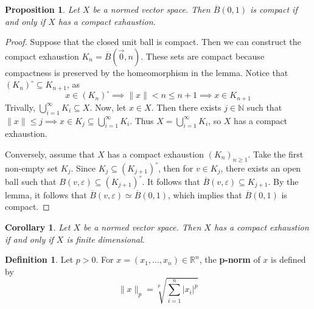 \documentclass{article}
\newcommand{\cl}[1]{\overline{#1}}
\theoremstyle{plain} %
\numberwithin{thm}{section} %
\newtheorem{prop}[thm]{Proposition}
\newtheorem{cor}[thm]{Corollary}
\theoremstyle{definition}
\newtheorem{defn}[thm]{Definition}
\begin{document}
    \begin{prop}
        Let \(X\) be a normed vector space. Then \(\cl{B}(0, 1)\) is compact if and only if \(X\) has a compact exhaustion.
    \end{prop}
    \begin{proof}
        Suppose that the closed unit ball is compact. Then we can construct the compact exhaustion \(K_n = \cl{B}(\vec{0}, n)\). These sets are compact because compactness is preserved by the homeomorphism in the lemma. Notice that \((K_n)^\circ \subseteq K_{n+1}\), as
        \[
            x \in (K_n)^\circ \implies \|x\| < n \leq n+1 \implies x \in K_{n+1}
        \]
        Trivally, \(\bigcup_{i=1}^{\infty} K_i \subseteq X\). Now, let \(x \in X\). Then there exists \(j \in \mathbb{N}\) such that \(\|x\| \leq j \implies x \in K_j \subseteq \bigcup_{i=1}^{\infty} K_i\). Thus \(X = \bigcup_{i=1}^{\infty} K_i\), so \(X\) has a compact exhaustion.

        Conversely, assume that \(X\) has a compact exhaustion \((K_n)_{n\geq 1}\). Take the first non-empty set \(K_j\). Since \(K_j \subseteq (K_{j+1})^\circ\), then for \(v \in K_j\), there exists an open ball such that \(B(v, \varepsilon) \subseteq (K_{j+1})^\circ\). It follows that \(\cl{B}(v, \varepsilon) \subseteq K_{j+1}\). By the lemma, it follows that \(\cl{B}(v, \varepsilon) \simeq \cl{B}(0, 1)\), which implies that \(\cl{B}(0,1)\) is compact.
        \smallbreak
    \end{proof}

    \begin{cor}
        Let \(X\) be a normed vector space. Then \(X\) has a compact exhaustion if and only if \(X\) is finite dimensional.
    \end{cor}

    \begin{defn}
        Let \(p > 0\). For \(x = (x_1, ..., x_n) \in \mathbb{R}^n\), the \textbf{p-norm} of \(x\) is defined by
        \[
            \|x\| _p = \sqrt[p]{\sum_{i=1}^n |x_i|^p}
        \]
    \end{defn}
\end{document}
